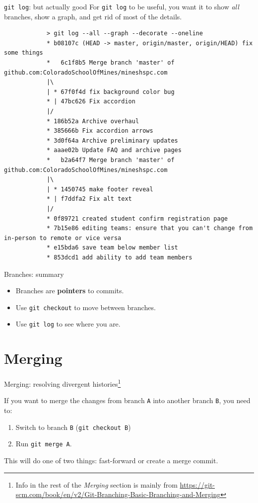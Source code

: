 \documentclass{beeper}
\begin{document}
\begin{frame}[fragile]{\texttt{git log}: but actually good}
    For \texttt{git log} to be useful, you want it to show \textit{all}
    branches, show a graph, and get rid of most of the details.

    {
        \tiny
        \begin{verbatim}
            > git log --all --graph --decorate --oneline
            * b08107c (HEAD -> master, origin/master, origin/HEAD) fix some things
            *   6c1f8b5 Merge branch 'master' of github.com:ColoradoSchoolOfMines/mineshspc.com
            |\
            | * 67f0f4d fix background color bug
            * | 47bc626 Fix accordion
            |/
            * 186b52a Archive overhaul
            * 385666b Fix accordion arrows
            * 3d0f64a Archive preliminary updates
            * aaae02b Update FAQ and archive pages
            *   b2a64f7 Merge branch 'master' of github.com:ColoradoSchoolOfMines/mineshspc.com
            |\
            | * 1450745 make footer reveal
            * | f7ddfa2 Fix alt text
            |/
            * 0f89721 created student confirm registration page
            * 7b15e86 editing teams: ensure that you can't change from in-person to remote or vice versa
            * e15bda6 save team below member list
            * 853dcd1 add ability to add team members
            \end{verbatim}
    }
\end{frame}

\begin{frame}{Branches: summary}
    \begin{itemize}
        \item Branches are \textbf{pointers} to commits.
        \item Use \texttt{git checkout} to move between branches.
        \item Use \texttt{git log} to see where you are.
    \end{itemize}
\end{frame}

\section{Merging}

\begin{frame}{Merging: resolving divergent histories\footnote[frame]{Info in the rest of the
    \textit{Merging} section is mainly from
    \url{https://git-scm.com/book/en/v2/Git-Branching-Basic-Branching-and-Merging}}}

    If you want to merge the changes from branch \texttt{A} into another branch
    \texttt{B}, you need to:

    \begin{enumerate}
        \item Switch to branch \texttt{B} (\texttt{git checkout B})
        \item Run \texttt{git merge A}.
    \end{enumerate}

    This will do one of two things: fast-forward or create a merge commit.
\end{frame}
\end{document}
